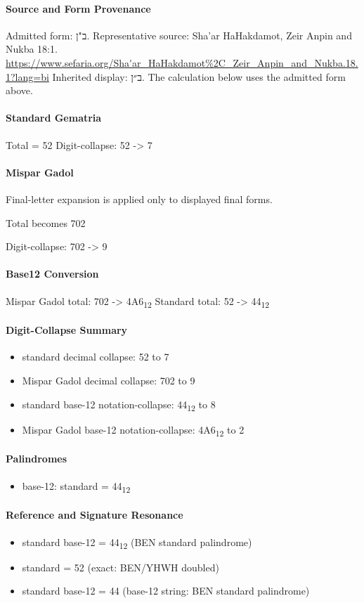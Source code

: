 \paragraph{Source and Form Provenance}
Admitted form: ב"ן.
Representative source: Sha'ar HaHakdamot, Zeir Anpin and Nukba 18:1.
\url{https://www.sefaria.org/Sha'ar_HaHakdamot%2C_Zeir_Anpin_and_Nukba.18.1?lang=bi}
Inherited display: ב״ן. The calculation below uses the admitted form above.
\paragraph{Standard Gematria}
Total = 52
Digit-collapse: 52 -> 7
\paragraph{Mispar Gadol}
Final-letter expansion is applied only to displayed final forms.

Total becomes 702

Digit-collapse: 702 -> 9
\paragraph{Base12 Conversion}
Mispar Gadol total: 702 -> 4A6\textsubscript{12}
Standard total: 52 -> 44\textsubscript{12}
\paragraph{Digit-Collapse Summary}
\begin{itemize}
\item standard decimal collapse: 52 to 7
\item Mispar Gadol decimal collapse: 702 to 9
\item standard base-12 notation-collapse: 44\textsubscript{12} to 8
\item Mispar Gadol base-12 notation-collapse: 4A6\textsubscript{12} to 2
\end{itemize}
\paragraph{Palindromes}
\begin{itemize}
\item base-12: standard = 44\textsubscript{12}
\end{itemize}
\paragraph{Reference and Signature Resonance}
\begin{itemize}
\item standard base-12 = 44\textsubscript{12} (BEN standard palindrome)
\item standard = 52 (exact: BEN/YHWH doubled)
\item standard base-12 = 44 (base-12 string: BEN standard palindrome)
\end{itemize}
